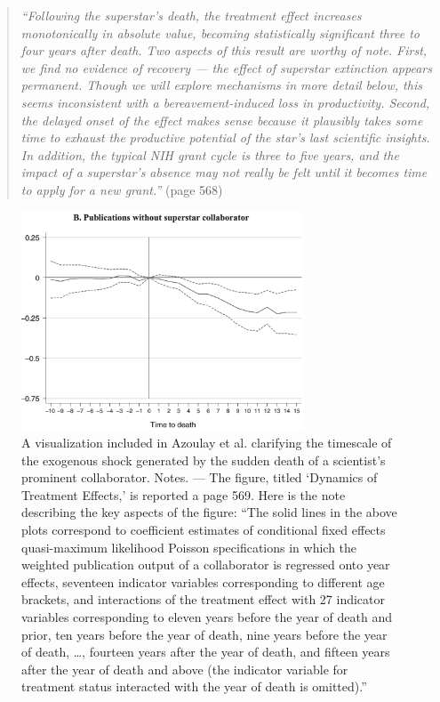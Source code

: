 \documentclass[11pt]{article}
\begin{document}
\begin{refsection}
\begin{quote}
  \textit{
    ``Following the superstar's death, the treatment effect increases
    monotonically in absolute value, becoming statistically significant three to
    four years after death. Two aspects of this result are worthy of note.
    First, we find no evidence of recovery --- the effect of superstar extinction
    appears permanent. Though we will explore mechanisms in more detail below,
    this seems inconsistent with a bereavement-induced loss in productivity.
    Second, the delayed onset of the effect makes sense because it plausibly
    takes some time to exhaust the productive potential of the star's last
    scientific insights. In addition, the typical NIH grant cycle is three to five
    years, and the impact of a superstar's absence may not really be felt until
    it becomes time to apply for a new grant.''
  }
  (page 568)
\end{quote}

\begin{figure}[!htbp]
    \begin{center}
      \includegraphics[width=0.75\textwidth]{exhibits/from_azoulay_et_al_2010.png}
    \end{center}
    \caption{A visualization included in Azoulay et al. 
    \autocite*[][]{azoulay_et_al_2010} clarifying the timescale of the 
    exogenous shock generated by the sudden death of a scientist's prominent
    collaborator. Notes. --- The figure, titled `Dynamics of Treatment Effects,'
    is reported a page 569. Here is the note describing the key aspects of the
    figure: ``The solid lines in the above plots correspond to coefficient
    estimates of conditional fixed effects quasi-maximum likelihood
    Poisson specifications in which the weighted publication output of a
    collaborator is regressed onto year effects, seventeen indicator
    variables corresponding to different age brackets, and interactions of the
    treatment effect with 27 indicator variables corresponding to eleven
    years before the year of death and prior, ten years before the year of death,
    nine years before the year of death, \ldots, fourteen years after the year of
    death, and fifteen years after the year of death and above (the indicator
    variable for treatment status interacted with the year of death is
    omitted).''}
    \label{fig:azoulay_et_al_2010}
\end{figure}


\end{refsection}
\end{document}
